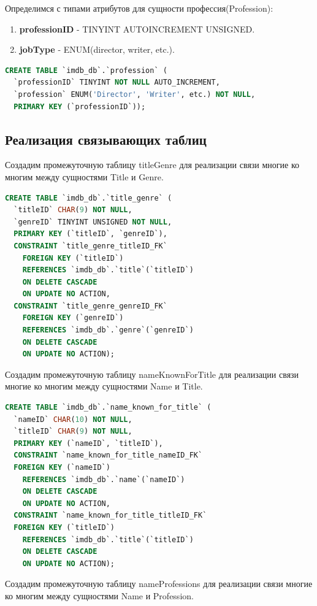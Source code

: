 \documentclass[12pt,a4paper]{article}
\begin{document}
Определимся с типами атрибутов для сущности профессия(Profession):
\begin{enumerate}
    \item \textbf{professionID} - TINYINT AUTOINCREMENT UNSIGNED.
    \item \textbf{jobType} - ENUM(director, writer, etc.).
\end{enumerate} \par
\begin{lstlisting}[language=SQL]
CREATE TABLE `imdb_db`.`profession` (
  `professionID` TINYINT NOT NULL AUTO_INCREMENT,
  `profession` ENUM('Director', 'Writer', etc.) NOT NULL,
  PRIMARY KEY (`professionID`));
\end{lstlisting}
\subsection{Реализация связывающих таблиц}
Создадим промежуточную таблицу titleGenre для реализации связи 
многие ко многим между сущностями Title и Genre.

\begin{lstlisting}[language=SQL]
CREATE TABLE `imdb_db`.`title_genre` (
  `titleID` CHAR(9) NOT NULL,
  `genreID` TINYINT UNSIGNED NOT NULL,
  PRIMARY KEY (`titleID`, `genreID`),
  CONSTRAINT `title_genre_titleID_FK`
    FOREIGN KEY (`titleID`) 
    REFERENCES `imdb_db`.`title`(`titleID`) 
    ON DELETE CASCADE 
    ON UPDATE NO ACTION,
  CONSTRAINT `title_genre_genreID_FK` 
    FOREIGN KEY (`genreID`)
    REFERENCES `imdb_db`.`genre`(`genreID`) 
    ON DELETE CASCADE 
    ON UPDATE NO ACTION);
\end{lstlisting}

Создадим промежуточную таблицу nameKnownForTitle для реализации связи 
многие ко многим между сущностями Name и Title.

\begin{lstlisting}[language=SQL]
CREATE TABLE `imdb_db`.`name_known_for_title` (
  `nameID` CHAR(10) NOT NULL,
  `titleID` CHAR(9) NOT NULL,
  PRIMARY KEY (`nameID`, `titleID`),
  CONSTRAINT `name_known_for_title_nameID_FK` 
  FOREIGN KEY (`nameID`)
    REFERENCES `imdb_db`.`name`(`nameID`)
    ON DELETE CASCADE
    ON UPDATE NO ACTION,
  CONSTRAINT `name_known_for_title_titleID_FK` 
  FOREIGN KEY (`titleID`)
    REFERENCES `imdb_db`.`title`(`titleID`)
    ON DELETE CASCADE
    ON UPDATE NO ACTION);
\end{lstlisting}

Создадим промежуточную таблицу nameProfessions для реализации связи 
многие ко многим между сущностями Name и Profession.
\end{document}
